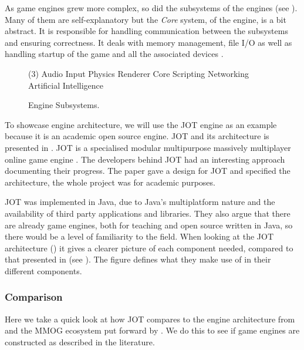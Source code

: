 As game engines grew more complex, so did the subsystems of the engines \cite{blow2004game, nystrom2014game} (see ). Many of them are self-explanatory but the \textit{Core} system, of the engine, is a bit abstract. It is responsible for handling communication between the subsystems and ensuring correctness. It deals with memory management, file \ac{I/O} as well as handling startup of the game and all the associated devices \cite{nilson2007game}. 

\begin{figure}[H]
    \centering
    \begin{tasks}[style=itemize, column-sep=0mm, label-align=left, label-offset={0mm}, label-width={10mm}, item-indent={3mm}](3)%
        \task Audio
        \task Input
        \task Physics 
        \task Renderer
        \task Core
        \task Scripting
        \task Networking
        \task Artificial Intelligence
    \end{tasks}
    \caption{Engine Subsystems.}
    \label{fig:engine-subsystes}
\end{figure}

To showcase engine architecture, we will use the JOT engine as an example because it is an academic open source engine. JOT and its architecture is presented in \cite{amador2014jot}. JOT is a specialised modular multipurpose massively multiplayer online game engine \cite{amador2014jot}. The developers behind JOT had an interesting approach documenting their progress. The paper gave a design for JOT and specified the architecture, the whole project was for academic purposes.

JOT was implemented in Java, due to Java's multiplatform nature and the availability of third party applications and libraries. They also argue that there are already game engines, both for teaching and open source written in Java, so there would be a level of familiarity to the field. When looking at the JOT architecture () it gives a clearer picture of each component needed, compared to that presented in \cite{5962102} (see ). The figure defines what they make use of in their different components.

\subsubsection{Comparison}
Here we take a quick look at how JOT compares to the engine architecture from \cite{5962102} and the MMOG ecosystem put forward by \cite{blow2004game}.
We do this to see if game engines are constructed as described in the literature.

